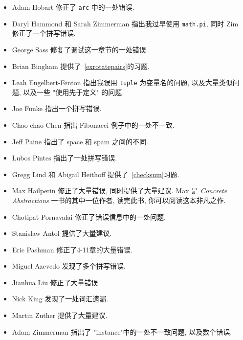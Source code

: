 \documentclass[10pt]{book}
\begin{document}
\begin{itemize}
\item Adam Hobart 修正了 {\tt arc} 中的一处错误. 

\item Daryl Hammond 和 Sarah Zimmerman 指出我过早使用 {\tt math.pi}, 
同时 Zim 修正了一个拼写错误. 

\item George Sass 修复了调试这一章节的一处错误. 

\item Brian Bingham 提供了~\ref{exrotatepairs}的习题. 

\item Leah Engelbert-Fenton 指出我误用 {\tt tuple} 为变量名的问题, 
以及大量类似问题, 以及一些 "使用先于定义" 的问题

\item Joe Funke 指出一个拼写错误. 

\item Chao-chao Chen 指出 Fibonacci 例子中的一处不一致. 

\item Jeff Paine 指出了 space 和 spam 之间的不同. 

\item Lubos Pintes 指出了一处拼写错误. 

\item Gregg Lind 和 Abigail Heithoff 提供了~\ref{checksum}习题. 

\item Max Hailperin 修正了大量错误, 同时提供了大量建议. 
Max 是 {\em Concrete Abstractions} 一书的其中一位作者, 读完此书, 
你可以阅读这本非凡之作. 

\item Chotipat Pornavalai 修正了错误信息中的一处问题. 

\item Stanislaw Antol 提供了大量建议. 

\item Eric Pashman 修正了4-11章的大量错误. 

\item Miguel Azevedo 发现了多个拼写错误. 

\item Jianhua Liu 修正了大量错误. 

\item Nick King 发现了一处词汇遗漏. 

\item Martin Zuther 提供了大量建议. 

\item Adam Zimmerman 指出了 "instance"中的一处不一致问题, 以及数个错误. 


\end{itemize}
\end{document}
